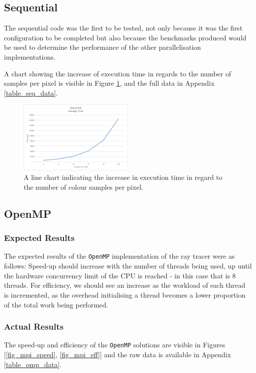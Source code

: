 \documentclass[journal,transmag]{IEEEtran}
\begin{document}
	\subsection{Sequential}
		The sequential code was the first to be tested, not only because it was the first configuration to be completed but also because the benchmarks produced would be used to determine the performance of the other parallelisation implementations.
		
		A chart showing the increase of execution time in regards to the number of samples per pixel is visible in Figure \ref{fig_seq_time}, and the full data in Appendix \ref{table_seq_data}.
		
		\begin{figure}[h]
			\centering
			\includegraphics[width = 0.5\textwidth]{chartSeqTime}
			\caption{A line chart indicating the increase in execution time in regard to the number of colour samples per pixel.}
			\label{fig_seq_time}
		\end{figure}
	
		

	\subsection{OpenMP}
		\subsubsection{Expected Results}
			The expected results of the \texttt{OpenMP} implementation of the ray tracer were as follows:
			Speed-up should increase with the number of threads being used, up until the hardware concurrency limit of the CPU is reached - in this case that is 8 threads.
			For efficiency, we should see an increase as the workload of each thread is incremented, as the overhead initialising a thread becomes a lower proportion of the total work being performed.
		
		\subsubsection{Actual Results}
			The speed-up and efficiency of the \texttt{OpenMP} solutions are visible in Figures [\ref{fig_mpi_speed}, \ref{fig_mpi_eff}] and the raw data is available in Appendix \ref{table_omp_data}.
			
\end{document}
